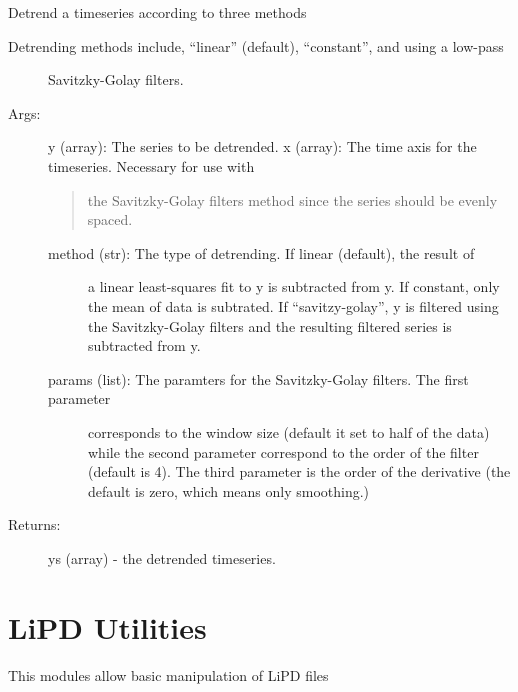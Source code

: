 \documentclass[letterpaper,10pt,english]{sphinxmanual}
\begin{document}
\begin{fulllineitems}
\label{\detokenize{Timeseries:pyleoclim.Timeseries.detrend}}
Detrend a timeseries according to three methods
\begin{description}
\item[{Detrending methods include, “linear” (default), “constant”, and using a low-pass}] \leavevmode
Savitzky-Golay filters.

\item[{Args:}] \leavevmode
y (array): The series to be detrended. 
x (array): The time axis for the timeseries. Necessary for use with
\begin{quote}

the Savitzky-Golay filters method since the series should be evenly spaced.
\end{quote}
\begin{description}
\item[{method (str): The type of detrending. If linear (default), the result of}] \leavevmode
a linear least-squares fit to y is subtracted from y. If constant, 
only the mean of data is subtrated. If “savitzy-golay”, y is filtered
using the Savitzky-Golay filters and the resulting filtered series
is subtracted from y.

\item[{params (list): The paramters for the Savitzky-Golay filters. The first parameter}] \leavevmode
corresponds to the window size (default it set to half of the data) 
while the second parameter correspond to the order of the filter 
(default is 4). The third parameter is the order of the derivative
(the default is zero, which means only smoothing.)

\end{description}

\item[{Returns:}] \leavevmode
ys (array) - the detrended timeseries.

\end{description}

\end{fulllineitems}



\chapter{LiPD Utilities}
\label{\detokenize{LipdUtils:lipd-utilities}}\label{\detokenize{LipdUtils::doc}}
This modules allow basic manipulation of LiPD files
\end{document}
